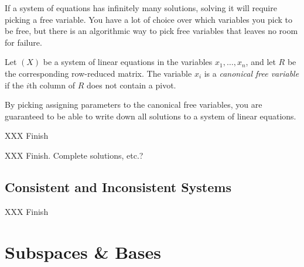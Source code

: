 If a system of equations has infinitely many solutions, solving it will
require picking a free variable. You have a lot of choice over which variables
you pick to be free, but there is an algorithmic way to pick free variables that leaves
no room for failure.
\begin{definition}
	Let $(X)$ be a system of linear equations in the variables
	$x_1,\ldots, x_n$, and let $R$ be the corresponding
	row-reduced matrix. The variable $x_i$ is a \emph{canonical
	free variable} if the $i$th column of $R$ does not contain a pivot.
\end{definition}
By picking assigning parameters to the canonical free variables, you are guaranteed
to be able to write down all solutions to a system of linear equations.

\begin{example}
	XXX Finish
\end{example}

XXX Finish. Complete solutions, etc.?

\subsection{Consistent and Inconsistent Systems}

XXX Finish


\section{Subspaces \& Bases}
